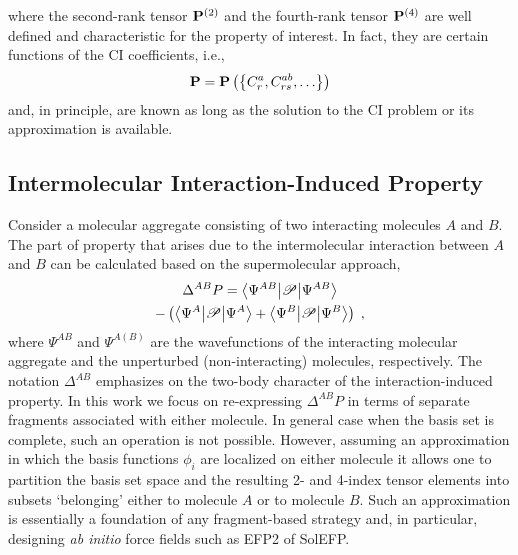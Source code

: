 where the second\hyp{}rank tensor ${\bf P}^{(2)}$ 
and the fourth\hyp{}rank tensor ${\bf P}^{(4)}$ 
are well defined and characteristic for the property of interest.
In fact, they are certain functions of the CI coefficients, i.e.,
%
\begin{equation}
{\bf P} = {\bf P}
\left(
 \left\{
  C_{r}^{a}, C_{rs}^{ab}, \ldots 
 \right\} 
\right)
\end{equation}
%
and, in principle, are known as long as the solution to the CI problem 
or its approximation is available.




\subsection{\label{ss:2.1}Intermolecular Interaction-Induced Property}

Consider a molecular aggregate consisting of two interacting 
molecules $A$ and $B$. The part of property that arises due to the
intermolecular interaction between $A$ and $B$ can be calculated
based on the supermolecular approach,
%
\begin{multline} \label{e:delta-p}
	\Delta^{AB} P = \bigl\langle {\Psi^{AB}} \bigl\lvert {\mathscr{P}} \bigl\lvert {\Psi^{AB}} \bigr\rangle \\- 
	\left(
	    \bigl\langle {\Psi^{A}} \bigl\lvert {\mathscr{P}} \bigl\lvert {\Psi^{A}} \bigr\rangle +
	    \bigl\langle {\Psi^{B}} \bigl\lvert {\mathscr{P}} \bigl\lvert {\Psi^{B}} \bigr\rangle
	\right)
	\;,
\end{multline}
%
where $\Psi^{AB}$ and $\Psi^{A(B)}$ are the wavefunctions of the interacting molecular aggregate
and the unperturbed (non\hyp{}interacting) molecules, respectively.
The notation $\Delta^{AB}$ emphasizes on the two\hyp{}body character of the interaction\hyp{}induced
property. In this work we focus on re\hyp{}expressing $\Delta^{AB}P$ in terms of separate
fragments associated with either molecule. In general case when the basis set
is complete, such an operation is not possible. However,
assuming an approximation
in which the basis functions $\phi_i$ 
are localized on either molecule it allows one to partition the basis set space
and the resulting 2\hyp{} and 4\hyp{}index tensor elements
into subsets `belonging' either to molecule $A$ or to molecule $B$.
Such an approximation is essentially a foundation of any fragment\hyp{}based strategy
and, in particular, designing \emph{ab initio} force fields such as EFP2
of SolEFP.

